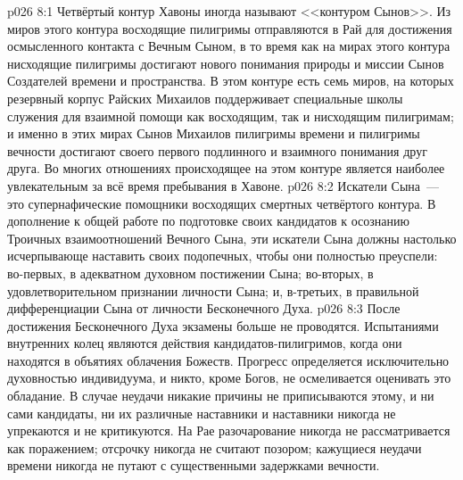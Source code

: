 \vs p026 8:1 Четвёртый контур Хавоны иногда называют <<контуром Сынов>>. Из миров этого контура восходящие пилигримы отправляются в Рай для достижения осмысленного контакта с Вечным Сыном, в то время как на мирах этого контура нисходящие пилигримы достигают нового понимания природы и миссии Сынов Создателей времени и пространства. В этом контуре есть семь миров, на которых резервный корпус Райских Михаилов поддерживает специальные школы служения для взаимной помощи как восходящим, так и нисходящим пилигримам; и именно в этих мирах Сынов Михаилов пилигримы времени и пилигримы вечности достигают своего первого подлинного и взаимного понимания друг друга. Во многих отношениях происходящее на этом контуре является наиболее увлекательным за всё время пребывания в Хавоне.
\vs p026 8:2 Искатели Сына~--- это супернафические помощники восходящих смертных четвёртого контура. В дополнение к общей работе по подготовке своих кандидатов к осознанию Троичных взаимоотношений Вечного Сына, эти искатели Сына должны настолько исчерпывающе наставить своих подопечных, чтобы они полностью преуспели: во\hyp{}первых, в адекватном духовном постижении Сына; во\hyp{}вторых, в удовлетворительном признании личности Сына; и, в\hyp{}третьих, в правильной дифференциации Сына от личности Бесконечного Духа.
\vs p026 8:3 После достижения Бесконечного Духа экзамены больше не проводятся. Испытаниями внутренних колец являются действия кандидатов\hyp{}пилигримов, когда они находятся в объятиях облачения Божеств. Прогресс определяется исключительно духовностью индивидуума, и никто, кроме Богов, не осмеливается оценивать это обладание. В случае неудачи никакие причины не приписываются этому, и ни сами кандидаты, ни их различные наставники и наставники никогда не упрекаются и не критикуются. На Рае разочарование никогда не рассматривается как поражением; отсрочку никогда не считают позором; кажущиеся неудачи времени никогда не путают с существенными задержками вечности.
